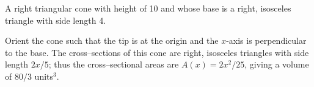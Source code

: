{A right triangular cone with height of 10 and whose base is a right, isosceles triangle with side length 4.

}
{Orient the cone such that the tip is at the origin and the $x$-axis is perpendicular to the base. The cross--sections of this cone are right, isosceles triangles with side length $2x/5$; thus the cross--sectional areas are $A(x) = 2x^2/25$, giving a volume of $80/3$ units$^3$.
}
